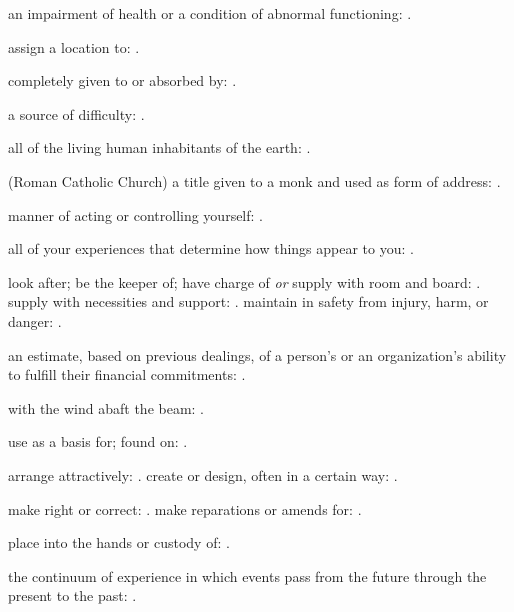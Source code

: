   an impairment of health or a condition of abnormal functioning: .

  assign a location to:   .

  completely given to or absorbed by: .

  a source of difficulty:   .

  all of the living human inhabitants of the earth:   .

  (Roman Catholic Church) a title given to a monk and used as form of address: .

  manner of acting or controlling yourself:   .

  all of your experiences that determine how things appear to you:   .

  look after; be the keeper of; have charge of \textit{or} supply with room and board: . supply with necessities and support:   . maintain in safety from injury, harm, or danger:   .

  an estimate, based on previous dealings, of a person's or an organization's ability to fulfill their financial commitments:   .

  with the wind abaft the beam: .

  use as a basis for; found on:   .

  arrange attractively:   . create or design, often in a certain way:   .

  make right or correct:   . make reparations or amends for:   .

  place into the hands or custody of:   .

  the continuum of experience in which events pass from the future through the present to the past: .

